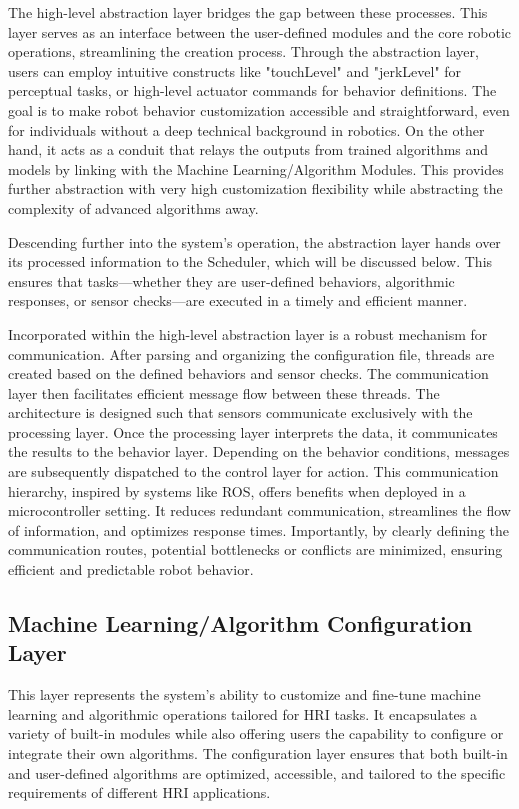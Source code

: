 \documentclass[runningheads]{llncs}
\begin{document}
The high-level abstraction layer bridges the gap between these processes. This layer serves as an interface between the user-defined modules and the core robotic operations, streamlining the creation process. Through the abstraction layer, users can employ intuitive constructs like "touchLevel" and "jerkLevel" for perceptual tasks, or high-level actuator commands for behavior definitions. The goal is to make robot behavior customization accessible and straightforward, even for individuals without a deep technical background in robotics. 
On the other hand, it acts as a conduit that relays the outputs from trained algorithms and models by linking with the Machine Learning/Algorithm Modules. This provides further abstraction with very high customization flexibility while abstracting the complexity of advanced algorithms away. 

Descending further into the system's operation, the abstraction layer hands over its processed information to the Scheduler, which will be discussed below. This ensures that tasks—whether they are user-defined behaviors, algorithmic responses, or sensor checks—are executed in a timely and efficient manner. 

Incorporated within the high-level abstraction layer is a robust mechanism for communication. After parsing and organizing the configuration file, threads are created based on the defined behaviors and sensor checks. The communication layer then facilitates efficient message flow between these threads. The architecture is designed such that sensors communicate exclusively with the processing layer. Once the processing layer interprets the data, it communicates the results to the behavior layer. Depending on the behavior conditions, messages are subsequently dispatched to the control layer for action. This communication hierarchy, inspired by systems like ROS, \cite{Quigley2009} offers benefits when deployed in a microcontroller setting. It reduces redundant communication, streamlines the flow of information, and optimizes response times. Importantly, by clearly defining the communication routes, potential bottlenecks or conflicts are minimized, ensuring efficient and predictable robot behavior.

\subsection{Machine Learning/Algorithm Configuration Layer}

This layer represents the system's ability to customize and fine-tune machine learning and algorithmic operations tailored for HRI tasks. It encapsulates a variety of built-in modules while also offering users the capability to configure or integrate their own algorithms. The configuration layer ensures that both built-in and user-defined algorithms are optimized, accessible, and tailored to the specific requirements of different HRI applications. 
\end{document}
